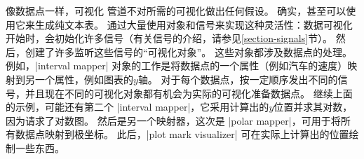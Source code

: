 
像数据点一样，可视化 管道不对所需的可视化做出任何假设。 确实，甚至可以使用它来生成纯文本表。 通过大量使用对象和信号来实现这种灵活性：数据可视化开始时，会初始化许多信号（有关信号的介绍，请参见\ref{section-signals}节）。 然后，创建了许多监听这些信号的``可视化对象''。 这些对象都涉及数据点的处理。 例如，|interval mapper| 对象的工作是将数据点的一个属性（例如汽车的速度）映射到另一个属性，例如图表的$y$轴。 对于每个数据点，按一定顺序发出不同的信号，并且现在不同的可视化对象都有机会为实际的可视化准备数据点。 继续上面的示例，可能还有第二个 |interval mapper|，它采用计算出的$y$位置并求其对数，因为请求了对数图。 然后是另一个映射器，这次是 |polar mapper|，可用于将所有数据点映射到极坐标。 此后，|plot mark visualizer| 可在实际上计算出的位置绘制一些东西。


